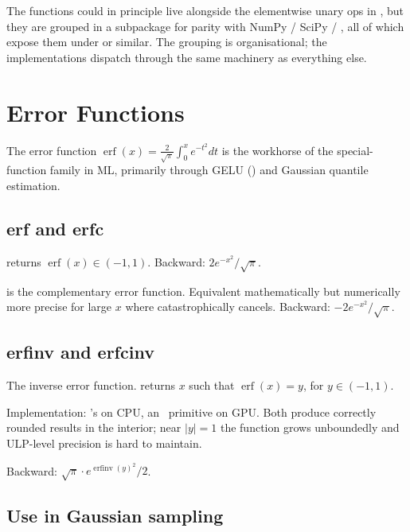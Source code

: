 The functions could in principle live alongside the elementwise
unary ops in , but they are grouped in a subpackage
for parity with NumPy / SciPy / , all of which
expose them under  or similar. The grouping is
organisational; the implementations dispatch through the same
 machinery as everything else.

\section{Error Functions}
\label{sec:special_functions:error_funcs}

The error function $\operatorname{erf}(x) = \frac{2}{\sqrt{\pi}}
\int_0^x e^{-t^2} dt$ is the workhorse of the special-function
family in ML, primarily through GELU ()
and Gaussian quantile estimation.

\subsection{erf and erfc}
\label{ssec:special_functions:erf_erfc}

 returns $\operatorname{erf}(x) \in (-1, 1)$.
Backward: $2 e^{-x^2} / \sqrt{\pi}$.

 is the complementary error function.
Equivalent mathematically but numerically more precise for
large $x$ where  catastrophically cancels.
Backward: $-2 e^{-x^2} / \sqrt{\pi}$.

\subsection{erfinv and erfcinv}
\label{ssec:special_functions:erfinv}

The inverse error function.  returns $x$ such
that $\operatorname{erf}(x) = y$, for $y \in (-1, 1)$.

Implementation: \Accelerate's  on CPU, an \MLX\
primitive on GPU. Both produce correctly rounded results in the
interior; near $|y| = 1$ the function grows unboundedly and
ULP-level precision is hard to maintain.

Backward: $\sqrt{\pi} \cdot e^{\operatorname{erfinv}(y)^2} / 2$.

\subsection{Use in Gaussian sampling}
\label{ssec:special_functions:gauss_sampling}

